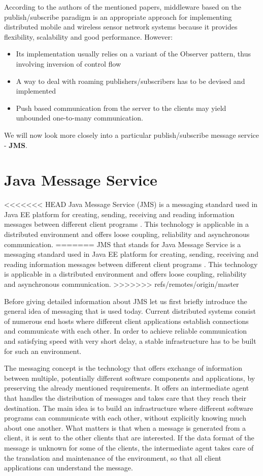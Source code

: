 \documentclass{sigplanconf}
\begin{document}
According to the authors of the mentioned papers, middleware based on the publish/subscribe paradigm is an appropriate approach for implementing distributed mobile and wireless sensor network systems because it provides flexibility, scalability and good performance. However:

\begin{itemize} \itemsep1pt \parskip0pt 
  \item Its implementation usually relies on a variant of the Observer pattern, thus involving inversion of control flow
  \item A way to deal with roaming publishers/subscribers has to be devised and implemented
  \item Push based communication from the server to the clients may yield unbounded one-to-many communication.
\end{itemize}
We will now look more closely into a particular publish/subscribe message service - \textbf{JMS}.

\section*{Java Message Service}

\smallskip
<<<<<<< HEAD
Java Message Service (JMS) is a messaging standard used in Java EE platform for creating, sending, receiving and reading information messages between different client programs \cite{jms} \cite{jmsd}. This technology is applicable in a distributed environment and offers loose coupling, reliability and asynchronous communication.
=======
JMS that stands for Java Message Service is a messaging standard used in Java EE platform for creating, sending, receiving and reading information messages between different client programs \cite{jms} \cite{jmsd}. This technology is applicable in a distributed environment and offers loose coupling, reliability and asynchronous communication.
>>>>>>> refs/remotes/origin/master

Before giving detailed information about JMS let us first briefly introduce the general idea of messaging that is used today. Current distributed systems consist of numerous end hosts where different client applications establish connections and communicate with each other. In order to achieve reliable communication and satisfying speed with very short delay, a stable infrastructure has to be built for such an environment.

The messaging concept is the technology that offers exchange of information between multiple, potentially different software components and applications, by preserving the already mentioned requirements. It offers an intermediate agent that handles the distribution of messages and takes care that they reach their destination. The main idea is to build an infrastructure where different software programs can communicate with each other, without explicitly knowing much about one another. What matters is that when a message is generated from a client, it is sent to the other clients that are interested. If the data format of the message is unknown for some of the clients, the intermediate agent takes care of the translation and maintenance of the environment, so that all client applications can understand the message.
\end{document}
